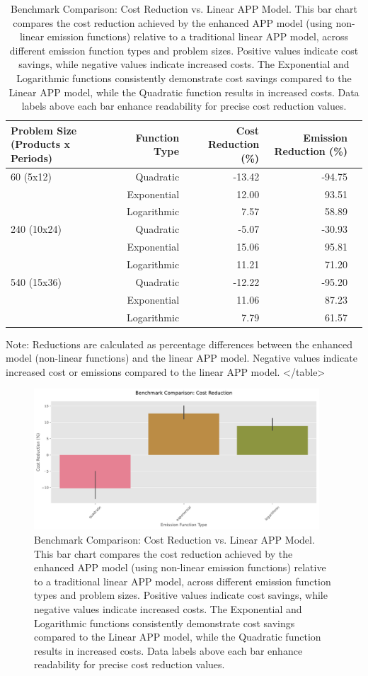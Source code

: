 \begin{table}[htbp]
\begin{table}[htbp]
\begin{table}[htbp]
    \centering
    \caption{Benchmark Comparison: Cost and Emission Reductions vs. Linear APP Model}
    \label{tab:benchmark_comparison}
    \begin{tabular}{lrrrr}
        \toprule
        Problem Size (Products x Periods) & Function Type & Cost Reduction (\%) & Emission Reduction (\%) \\
        \midrule
        60 (5x12) & Quadratic & -13.42 & -94.75 \\
        & Exponential & 12.00 & 93.51 \\
        & Logarithmic & 7.57 & 58.89 \\
        \midrule
        240 (10x24) & Quadratic & -5.07 & -30.93 \\
        & Exponential & 15.06 & 95.81 \\
        & Logarithmic & 11.21 & 71.20 \\
        \midrule
        540 (15x36) & Quadratic & -12.22 & -95.20 \\
        & Exponential & 11.06 & 87.23 \\
        & Logarithmic & 7.79 & 61.57 \\
        \bottomrule
    \end{tabular}
    \footnotesize{Note: Reductions are calculated as percentage differences between the enhanced model (non-linear functions) and the linear APP model. Negative values indicate increased cost or emissions compared to the linear APP model.}
</table>

\begin{figure}[htbp]
    \centering
    \includegraphics[width=0.95\textwidth]{images/benchmark_comparison.pdf}
    \caption{Benchmark Comparison: Cost Reduction vs. Linear APP Model.
    This bar chart compares the cost reduction achieved by the enhanced APP model (using non-linear emission functions) relative to a traditional linear APP model, across different emission function types and problem sizes. Positive values indicate cost savings, while negative values indicate increased costs. The Exponential and Logarithmic functions consistently demonstrate cost savings compared to the Linear APP model, while the Quadratic function results in increased costs. Data labels above each bar enhance readability for precise cost reduction values.}
    \label{fig:benchmark_comparison_bar}
\end{figure}


\end{table}
\end{table}
\end{table}
